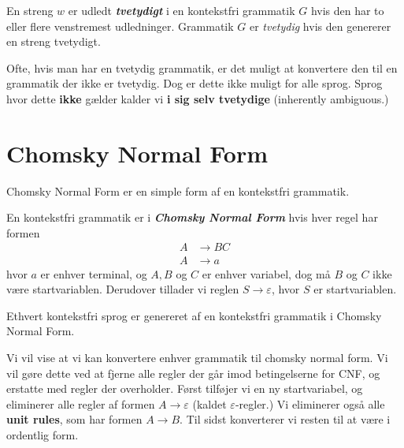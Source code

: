 \begin{definition}[Tvetydighed]
En streng $w$ er udledt \textbf{\textit{tvetydigt}} i en kontekstfri grammatik $G$ hvis den har to eller flere venstremest udledninger. Grammatik $G$ er \textit{tvetydig} hvis den genererer en streng tvetydigt.
\end{definition}

Ofte, hvis man har en tvetydig grammatik, er det muligt at konvertere den til en grammatik der ikke er tvetydig. Dog er dette ikke muligt for alle sprog. Sprog hvor dette \textbf{ikke} gælder kalder vi \textbf{i sig selv tvetydige} (inherently ambiguous.)

\newpage
\section{Chomsky Normal Form}%
\label{sec:cnf}

Chomsky Normal Form er en simple form af en kontekstfri grammatik.

\begin{definition}
  En kontekstfri grammatik er i \textbf{\textit{Chomsky Normal Form}} hvis hver regel har formen
  \begin{equation*}
\begin{split}
  A &\rightarrow BC\\
  A &\rightarrow a
\end{split}
  \end{equation*}
  hvor $a$ er enhver terminal, og $A, B$ og $C$ er enhver variabel, dog må $B$ og $C$ ikke være startvariablen. Derudover tillader vi reglen $S \rightarrow \varepsilon$, hvor $S$ er startvariablen.
\end{definition}

\begin{theorem}
Ethvert kontekstfri sprog er genereret af en kontekstfri grammatik i Chomsky Normal Form.
\end{theorem}

Vi vil vise at vi kan konvertere enhver grammatik til chomsky normal form. Vi vil gøre dette ved at fjerne alle regler der går imod betingelserne for CNF, og erstatte med regler der overholder. Først tilføjer vi en ny startvariabel, og eliminerer alle regler af formen $A \rightarrow \varepsilon$ (kaldet $\varepsilon$-regler.) Vi eliminerer også alle \textbf{unit rules}, som har formen $A \rightarrow B$. Til sidst konverterer vi resten til at være i ordentlig form.

